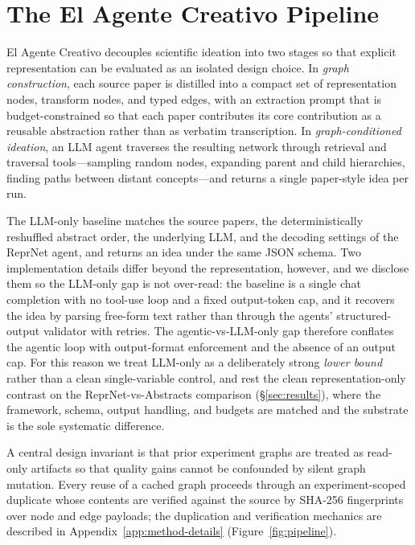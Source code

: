 \documentclass[10pt,twocolumn]{article}
\begin{document}
\section{The El Agente Creativo Pipeline}

El Agente Creativo decouples scientific ideation into two stages so that explicit
representation can be evaluated as an isolated design choice.  In
\emph{graph construction}, each source paper is distilled into a compact
set of representation nodes, transform nodes, and typed edges, with an
extraction prompt that is budget-constrained so that each paper contributes
its core contribution as a reusable abstraction rather than as verbatim
transcription.  In \emph{graph-conditioned ideation}, an LLM agent
traverses the resulting network through retrieval and traversal
tools---sampling random nodes, expanding parent and child hierarchies,
finding paths between distant concepts---and returns a single paper-style
idea per run.

The LLM-only baseline matches the source papers, the deterministically
reshuffled abstract order, the underlying LLM, and the decoding
settings of the ReprNet agent, and returns an idea under the same
JSON schema.  Two implementation details differ beyond the
representation, however, and we disclose them so the LLM-only gap is
not over-read: the baseline is a single chat completion with no
tool-use loop and a fixed output-token cap, and it recovers the idea
by parsing free-form text rather than through the agents'
structured-output validator with retries.  The agentic-vs-LLM-only
gap therefore conflates the agentic loop with output-format
enforcement and the absence of an output cap.  For this reason we
treat LLM-only as a deliberately strong \emph{lower bound} rather than
a clean single-variable control, and rest the clean
representation-only contrast on the ReprNet-vs-Abstracts comparison
(\S\ref{sec:results}), where the framework, schema, output handling,
and budgets are matched and the substrate is the sole systematic
difference.

A central design invariant is that prior experiment graphs are treated
as read-only artifacts so that quality gains cannot be confounded by
silent graph mutation.  Every reuse of a cached graph proceeds through
an experiment-scoped duplicate whose contents are verified against the
source by SHA-256 fingerprints over node and edge payloads; the
duplication and verification mechanics are described in
Appendix~\ref{app:method-details} (Figure~\ref{fig:pipeline}).
\end{document}

